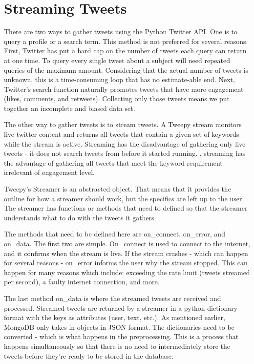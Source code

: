 \documentclass[11pt, twoside, reqno]{book}
\begin{document}
\section{Streaming Tweets}
\label{sec:streaming}
\hspace{0.2in} There are two ways to gather tweets using the Python Twitter API. One is to query a profile or a search term\cite{twitter}. This method is not preferred for several reasons. First, Twitter has put a hard cap on the number of tweets each query can return at one time. To query every single tweet about a subject will need repeated queries of the maximum amount\cite{twitter}. Considering that the actual number of tweets is unknown, this is a time-consuming loop that has no estimate-able end. Next, Twitter's search function naturally promotes tweets that have more engagement (likes, comments, and retweets). Collecting only those tweets means we put together an incomplete and biased data set. 

The other way to gather tweets is to stream tweets\cite{twitter}. A Tweepy stream monitors live twitter content and returns all tweets that contain a given set of keywords while the stream is active. Streaming has the disadvantage of gathering only live tweets - it does not search tweets from before it started running. , streaming has the advantage of gathering all tweets that meet the keyword requirement irrelevant of engagement level. 

Tweepy's Streamer is an abstracted object\cite{twitter}. That means that it provides the outline for how a streamer should work, but the specifics are left up to the user. The streamer has functions or methods that need to defined so that the streamer understands what to do with the tweets it gathers. 

The methods that need to be defined here are on\_connect, on\_error, and on\_data. The first two are simple. On\_connect is used to connect to the internet, and it confirms when the stream is live. If the stream crashes - which can happen for several reasons - on\_error informs the user why the stream stopped. This can happen for many reasons which include: exceeding the rate limit (tweets streamed per second), a faulty internet connection, and more. 

The last method on\_data is where the streamed tweets are received and processed.  Streamed tweets are returned by a streamer in a python dictionary format with the keys as attributes (user, text, etc.). As mentioned earlier, MongoDB only takes in objects in JSON format. The dictionaries need to be converted - which is what happens in the preprocessing.  This is a process that happens simultaneously so that there is no need to intermediately store the tweets before they're ready to be stored in the database. 
\end{document}
